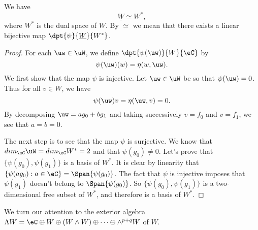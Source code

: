 \begin{proposition}
	We have
	\begin{equation}
		\underline{W}\simeq W^*,
	\end{equation}
	where $W^*$ is the dual space of $W$. By $\simeq$ we mean that there exists a linear bijective map $\dpt{\psi}{\underline{W}}{W^*}$.
\end{proposition}
\begin{proof}
	For each $\uw\in\uW$, we define $\dpt{\psi(\uw)}{W}{\eC}$ by
	\[
		\psi(\uw)(w)=\eta(w,\uw).
	\]
	We first show that the map $\psi$ is injective. Let $\uw\in\uW$ be so that $\psi(\uw)=0$. Thus for all $v\in W$, we have
	\begin{equation}\label{3101r1}
		\psi(\uw)v=\eta(\uw,v)=0.
	\end{equation}
	By decomposing $\uw=ag_0+bg_1$ and taking successively $v=f_0$ and $v=f_1$, we see that $a=b=0$.

	The next step is to see that the map $\psi$ is surjective. We know that $dim_{\eC}\uW=dim_{\eC}W^*=2$ and that $\psi(g_0)\neq 0$. Let's prove that $\{\psi(g_0),\psi(g_1)\}$ is a basis of $W^*$. It is clear by linearity that $\{\psi(ag_0):a\in\eC\}=\Span\{\psi(g_0)\}$. The fact that $\psi$ is injective  imposes that $\psi(g_1)$ doesn't belong to $\Span\{\psi(g_0)\}$. So $\{\psi(g_0),\psi(g_1)\}$ is a two-dimensional free subset of $W^*$, and therefore is a basis of $W^*$.
\end{proof}

We turn our attention to the exterior algebra $\Lambda W=\eC\oplus W\oplus(W\wedge W)\oplus\cdots\oplus\wedge^{p+q}W$ of $W$.

